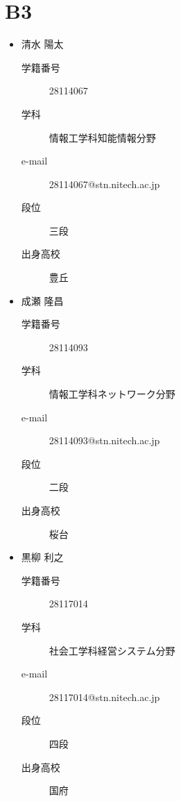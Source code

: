 \documentclass[a4paper,11pt,dvipdfmx]{jsarticle}
\begin{document}
\section{B3}
\begin{itemize}
    \item 清水 陽太
    \begin{description}
        \item[学籍番号]28114067
        \item[学科] 情報工学科知能情報分野
        \item[e-mail]28114067@stn.nitech.ac.jp
        \item[段位]三段
        \item[出身高校]豊丘 
    \end{description}
\end{itemize}
\begin{itemize}
    \item 成瀬 隆昌
    \begin{description}
        \item[学籍番号]28114093
        \item[学科] 情報工学科ネットワーク分野
        \item[e-mail]28114093@stn.nitech.ac.jp
        \item[段位]二段
        \item[出身高校]桜台 
    \end{description}
\end{itemize}
\begin{itemize}
    \item 黒柳 利之
    \begin{description}
        \item[学籍番号]28117014
        \item[学科] 社会工学科経営システム分野
        \item[e-mail]28117014@stn.nitech.ac.jp
        \item[段位]四段
        \item[出身高校]国府 
    \end{description}
\end{itemize}
\end{document}
